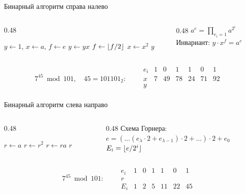 \documentclass{ca-slides}
\begin{document}
\begin{canvasframe}{Бинарный алгоритм справа налево}
  \begin{columns}[T]
    \begin{column}{0.48\textwidth}
      \begin{algorithmic}[1]
        \State $y \gets 1$, $x \gets a$, $f \gets e$
           $y \gets yx$ \EndIf
          \State $f \gets \lfloor f/2\rfloor$
           $x \gets x^2$ \EndIf
        \EndWhile
        \State \Return $y$
      \end{algorithmic}
    \end{column}
    \begin{column}{0.48\textwidth}
      $a^e = \prod\limits_{e_i = 1} a^{2^i}$\\[1ex]
      Инвариант: $y \cdot x^f = a^e$
    \end{column}
  \end{columns}
  \medskip
  \[
    7^{45} \bmod 101, \quad 45 = 101101_2: \qquad
    \begin{array}{c|cccccc}
      e_i & 1 & 0 & 1 & 1 & 0 & 1 \\ \hline
      x & 7 & 49 & 78 & 24 & 71 & 92 \\
      y & & & & & & \\
    \end{array}
  \]
\end{canvasframe}

\begin{canvasframe}{Бинарный алгоритм слева направо}
  \begin{columns}[T]
    \begin{column}{0.48\textwidth}
      \begin{algorithmic}[1]
        \State $r \gets a$
          \State $r \gets r^2$
           $r \gets r a$ \EndIf
        \EndFor
        \State \Return $r$
      \end{algorithmic}
    \end{column}
    \begin{column}{0.48\textwidth}
      Схема Горнера:\\
      $e = (\dots(e_\lambda \cdot 2 + e_{\lambda-1}) \cdot 2 + \dots) \cdot 2 + e_0$\\[1ex]
      $E_i = \lfloor e/2^i\rfloor$
    \end{column}
  \end{columns}
  \[
    7^{45} \bmod 101: \qquad
    \begin{array}{c|cccccc}
      e_i & 1 & 0 & 1 & 1 & 0 & 1 \\ \hline
      r & & & & & & \\
      E_i & 1 & 2 & 5 & 11 & 22 & 45
    \end{array}
  \]
\end{canvasframe}
\end{document}
